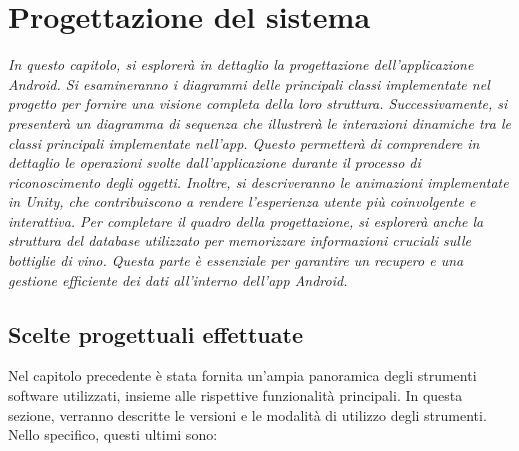 \chapter{Progettazione del sistema}

\begin{preamble}
{\em 
In questo capitolo, si esplorerà in dettaglio la progettazione dell'applicazione Android. Si esamineranno i diagrammi delle principali classi implementate nel progetto per fornire una visione completa della loro struttura. \newline \indent Successivamente, si presenterà un diagramma di sequenza che illustrerà le interazioni dinamiche tra le classi principali implementate nell'app. Questo permetterà di comprendere in dettaglio le operazioni svolte dall'applicazione durante il processo di riconoscimento degli oggetti. \newline \indent Inoltre, si descriveranno le animazioni implementate in Unity, che contribuiscono a rendere l'esperienza utente più coinvolgente e interattiva. Per completare il quadro della progettazione, si esplorerà anche la struttura del database utilizzato per memorizzare informazioni cruciali sulle bottiglie di vino. Questa parte è essenziale per garantire un recupero e una gestione efficiente dei dati all'interno dell'app Android.
}
\end{preamble}

\section{Scelte progettuali effettuate}

Nel capitolo precedente è stata fornita un'ampia panoramica degli strumenti software utilizzati, insieme alle rispettive funzionalità principali. In questa sezione, verranno descritte le versioni e le modalità di utilizzo degli strumenti. Nello specifico, questi ultimi sono:


